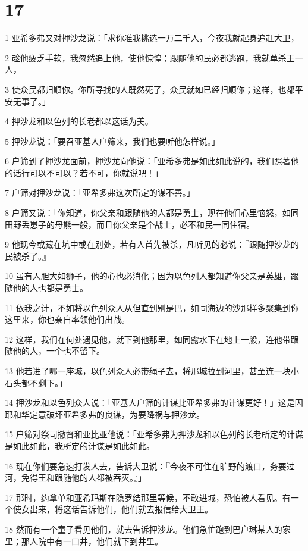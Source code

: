 \chapter{17}

\par 1 亚希多弗又对押沙龙说：「求你准我挑选一万二千人，今夜我就起身追赶大卫，
\par 2 趁他疲乏手软，我忽然追上他，使他惊惶；跟随他的民必都逃跑，我就单杀王一人，
\par 3 使众民都归顺你。你所寻找的人既然死了，众民就如已经归顺你；这样，也都平安无事了。」
\par 4 押沙龙和以色列的长老都以这话为美。
\par 5 押沙龙说：「要召亚基人户筛来，我们也要听他怎样说。」
\par 6 户筛到了押沙龙面前，押沙龙向他说：「亚希多弗是如此如此说的，我们照著他的话行可以不可以？若不可，你就说吧！」
\par 7 户筛对押沙龙说：「亚希多弗这次所定的谋不善。」
\par 8 户筛又说：「你知道，你父亲和跟随他的人都是勇士，现在他们心里恼怒，如同田野丢崽子的母熊一般，而且你父亲是个战士，必不和民一同住宿。
\par 9 他现今或藏在坑中或在别处，若有人首先被杀，凡听见的必说：『跟随押沙龙的民被杀了。』
\par 10 虽有人胆大如狮子，他的心也必消化；因为以色列人都知道你父亲是英雄，跟随他的人也都是勇士。
\par 11 依我之计，不如将以色列众人从但直到别是巴，如同海边的沙那样多聚集到你这里来，你也亲自率领他们出战。
\par 12 这样，我们在何处遇见他，就下到他那里，如同露水下在地上一般，连他带跟随他的人，一个也不留下。
\par 13 他若进了哪一座城，以色列众人必带绳子去，将那城拉到河里，甚至连一块小石头都不剩下。」
\par 14 押沙龙和以色列众人说：「亚基人户筛的计谋比亚希多弗的计谋更好！」这是因耶和华定意破坏亚希多弗的良谋，为要降祸与押沙龙。
\par 15 户筛对祭司撒督和亚比亚他说：「亚希多弗为押沙龙和以色列的长老所定的计谋是如此如此，我所定的计谋是如此如此。
\par 16 现在你们要急速打发人去，告诉大卫说：『今夜不可住在旷野的渡口，务要过河，免得王和跟随他的人都被吞灭。』」
\par 17 那时，约拿单和亚希玛斯在隐罗结那里等候，不敢进城，恐怕被人看见。有一个使女出来，将这话告诉他们，他们就去报信给大卫王。
\par 18 然而有一个童子看见他们，就去告诉押沙龙。他们急忙跑到巴户琳某人的家里；那人院中有一口井，他们就下到井里。
